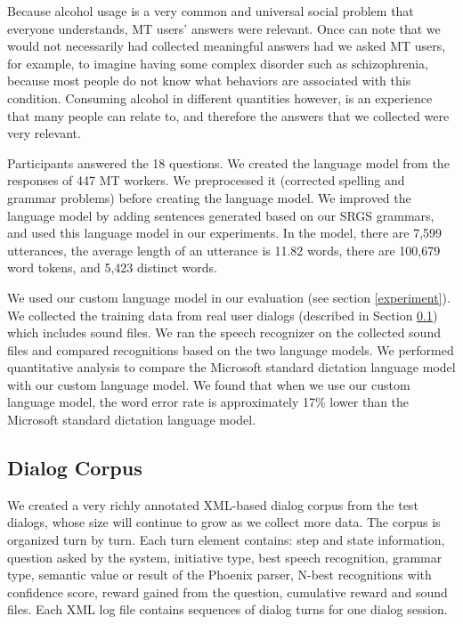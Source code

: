 \begin{sloppy}
Because alcohol usage is a very common and universal social problem that everyone understands, MT users' answers were relevant.  Once can note that we would not necessarily had collected meaningful answers had we asked MT users, for example, to imagine having some complex disorder such as schizophrenia, because most people do not know what behaviors are associated with this condition.  Consuming alcohol in different quantities however, is an experience that many people can relate to, and therefore the answers that we collected were very relevant.

Participants answered the 18 questions. We  created the language model from the responses of 447 MT workers. We preprocessed it (corrected  spelling and grammar problems) before creating the language model. We improved the language model by adding sentences generated based on our SRGS grammars, and used this language model in our experiments. In the model, there are 7,599 utterances, the average length of an utterance is 11.82 words, there are 100,679 word tokens, and 5,423 distinct words. 

We used our custom language model in our evaluation (see section \ref{experiment}). We collected the training data from real user dialogs (described in Section \ref{corpus}) which includes sound files. We ran the speech recognizer on the collected sound files and compared recognitions based on the two language models.  We performed quantitative analysis to compare the Microsoft standard dictation language model with our custom language model. We found that when we use our custom language model, the word error rate is approximately 17\% lower than the Microsoft standard dictation language model.
  
\subsection{Dialog Corpus}
\label{corpus}

We created a very richly annotated XML-based dialog corpus from the test dialogs, whose size will continue to grow as we collect more data. The corpus is organized turn by turn. Each turn element contains: step and state information, question asked by the system,  initiative type,  best speech recognition, grammar type, semantic value or result of the Phoenix parser, N-best recognitions with confidence score, reward gained from the question, cumulative reward and sound files. Each XML log file contains sequences of dialog turns for one dialog session. 


\end{sloppy}
